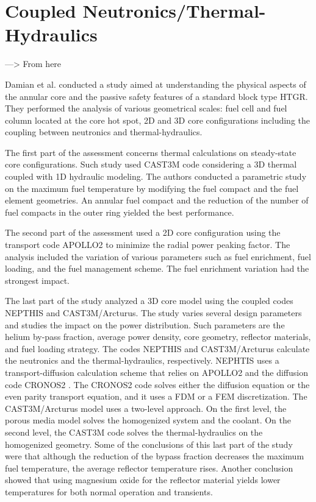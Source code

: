 \documentclass[11pt,letterpaper]{article}
\begin{document}
\section{Coupled Neutronics/Thermal-Hydraulics}

---> From here


Damian et al. \cite{damian_vhtr_2008} conducted a study aimed at understanding the physical aspects of the annular core and the passive safety features of a standard block type \gls{HTGR}.
They performed the analysis of various geometrical scales: fuel cell and fuel column located at the core hot spot, 2D and 3D core configurations including the coupling between neutronics and thermal-hydraulics.

The first part of the assessment concerns thermal calculations on steady-state core configurations.
Such study used CAST3M \cite{studer_cast3marcturus_2007} code considering a 3D thermal coupled with 1D hydraulic modeling.
The authors conducted a parametric study on the maximum fuel temperature by modifying the fuel compact and the fuel element geometries.
An annular fuel compact and the reduction of the number of fuel compacts in the outer ring yielded the best performance.

The second part of the assessment used a 2D core configuration using the transport code APOLLO2 \cite{sanchez_apollo2_1999} to minimize the radial power peaking factor.
The analysis included the variation of various parameters such as fuel enrichment, fuel loading, and the fuel management scheme.
The fuel enrichment variation had the strongest impact.

The last part of the study analyzed a 3D core model using the coupled codes NEPTHIS \cite{cavalier_presentation_2005} and CAST3M/Arcturus.
The study varies several design parameters and studies the impact on the power distribution.
Such parameters are the helium by-pass fraction, average power density, core geometry, reflector materials, and fuel loading strategy.
The codes NEPTHIS and CAST3M/Arcturus calculate the neutronics and the thermal-hydraulics, respectively.
NEPHTIS uses a transport-diffusion calculation scheme that relies on APOLLO2 and the diffusion code CRONOS2 \cite{lautard_cronos_1990}.
The CRONOS2 code solves either the diffusion equation or the even parity transport equation, and it uses a \gls{FDM} or a \gls{FEM} discretization.
The CAST3M/Arcturus model uses a two-level approach.
On the first level, the porous media model solves the homogenized system and the coolant.
On the second level, the CAST3M code solves the thermal-hydraulics on the homogenized geometry.
Some of the conclusions of this last part of the study were that although the reduction of the bypass fraction decreases the maximum fuel temperature, the average reflector temperature rises.
Another conclusion showed that using magnesium oxide for the reflector material yields lower temperatures for both normal operation and transients.
\end{document}
